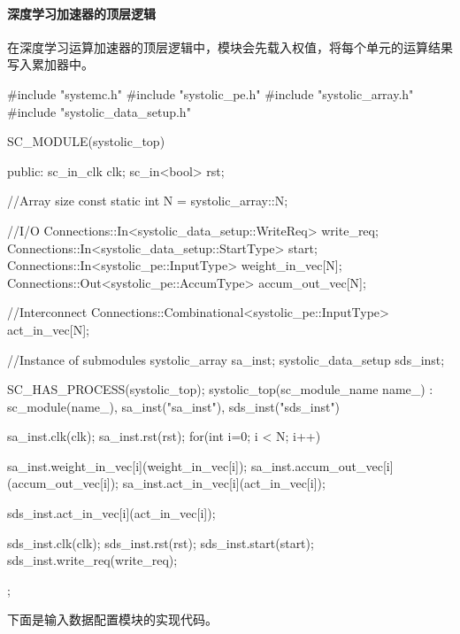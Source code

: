 \paragraph{深度学习加速器的顶层逻辑}
在深度学习运算加速器的顶层逻辑中，模块会先载入权值，将每个单元的运算结果写入累加器中。
\begin{codeblock}[language=c++]
#include "systemc.h"
#include "systolic_pe.h"
#include "systolic_array.h"
#include "systolic_data_setup.h"

SC_MODULE(systolic_top){
  public:
    sc_in_clk clk;
    sc_in<bool> rst;

  //Array size
  const static int N = systolic_array::N;

  //I/O
  Connections::In<systolic_data_setup::WriteReq>  write_req;
  Connections::In<systolic_data_setup::StartType> start;
  Connections::In<systolic_pe::InputType>         weight_in_vec[N];
  Connections::Out<systolic_pe::AccumType>        accum_out_vec[N];

  //Interconnect
  Connections::Combinational<systolic_pe::InputType>  act_in_vec[N];

  //Instance of submodules
  systolic_array      sa_inst;
  systolic_data_setup sds_inst;

  SC_HAS_PROCESS(systolic_top);
  systolic_top(sc_module_name name_) : sc_module(name_),
    sa_inst("sa_inst"),
    sds_inst("sds_inst")
  {
    sa_inst.clk(clk);
    sa_inst.rst(rst);
    for(int i=0; i < N; i++){
      sa_inst.weight_in_vec[i](weight_in_vec[i]);
      sa_inst.accum_out_vec[i](accum_out_vec[i]);
      sa_inst.act_in_vec[i](act_in_vec[i]);

      sds_inst.act_in_vec[i](act_in_vec[i]);
    }

    sds_inst.clk(clk);
    sds_inst.rst(rst);
    sds_inst.start(start);
    sds_inst.write_req(write_req);
  }
};

\end{codeblock}


下面是输入数据配置模块的实现代码。


